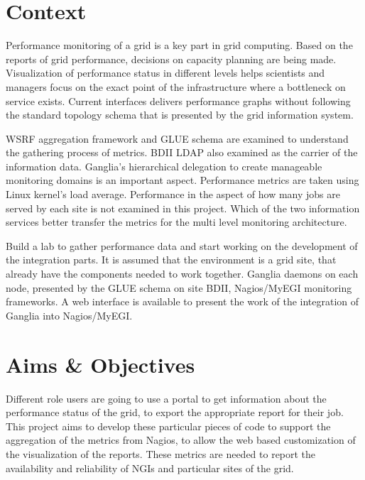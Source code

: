 
\section{Context}

Performance monitoring of a grid is a key part in grid computing. Based on the reports of grid performance, decisions on capacity planning are being made. Visualization of performance status in different levels helps scientists and managers focus on the exact point of the infrastructure where a bottleneck on service exists.
Current interfaces delivers performance graphs without following the standard topology schema that is presented by the grid information system.

WSRF aggregation framework and GLUE schema are examined to understand the gathering process of metrics. BDII LDAP also examined as the carrier of the information data. Ganglia's hierarchical delegation to create manageable monitoring domains is an important aspect. Performance metrics are taken using Linux kernel's load average.
Performance in the aspect of how many jobs are served by each site is not examined in this project.
Which of the two information services better transfer the metrics for the multi level monitoring architecture.

Build a lab to gather performance data and start working on the development of the integration parts.
It is assumed that the environment is a grid site, that already have the components needed to work together. Ganglia daemons on each node, presented by the GLUE schema on site BDII, Nagios/MyEGI monitoring frameworks.
A web interface is available to present the work of the integration of Ganglia into Nagios/MyEGI.


\section{Aims \& Objectives}

Different role users are going to use a portal to get information about the performance status of the grid, to export the appropriate report for their job. This project aims to develop these particular pieces of code to support the aggregation of the metrics from Nagios, to allow the web based customization of the visualization of the reports. These metrics are needed to report the availability and reliability of NGIs and particular sites of the grid.

